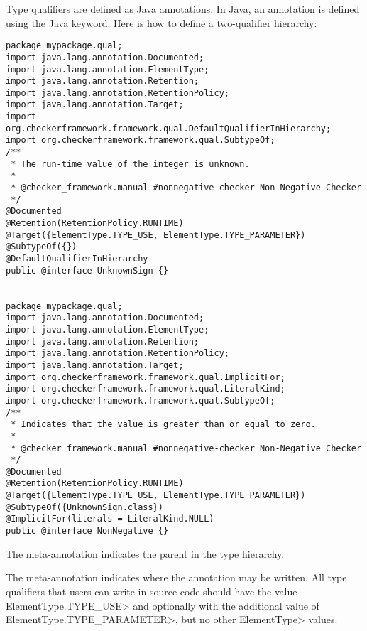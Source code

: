 Type qualifiers are defined as Java annotations.  In Java, an
annotation is defined using the Java  keyword.
Here is how to define a two-qualifier hierarchy:

\begin{Verbatim}
package mypackage.qual;
import java.lang.annotation.Documented;
import java.lang.annotation.ElementType;
import java.lang.annotation.Retention;
import java.lang.annotation.RetentionPolicy;
import java.lang.annotation.Target;
import org.checkerframework.framework.qual.DefaultQualifierInHierarchy;
import org.checkerframework.framework.qual.SubtypeOf;
/**
 * The run-time value of the integer is unknown.
 *
 * @checker_framework.manual #nonnegative-checker Non-Negative Checker
 */
@Documented
@Retention(RetentionPolicy.RUNTIME)
@Target({ElementType.TYPE_USE, ElementType.TYPE_PARAMETER})
@SubtypeOf({})
@DefaultQualifierInHierarchy
public @interface UnknownSign {}


package mypackage.qual;
import java.lang.annotation.Documented;
import java.lang.annotation.ElementType;
import java.lang.annotation.Retention;
import java.lang.annotation.RetentionPolicy;
import java.lang.annotation.Target;
import org.checkerframework.framework.qual.ImplicitFor;
import org.checkerframework.framework.qual.LiteralKind;
import org.checkerframework.framework.qual.SubtypeOf;
/**
 * Indicates that the value is greater than or equal to zero.
 *
 * @checker_framework.manual #nonnegative-checker Non-Negative Checker
 */
@Documented
@Retention(RetentionPolicy.RUNTIME)
@Target({ElementType.TYPE_USE, ElementType.TYPE_PARAMETER})
@SubtypeOf({UnknownSign.class})
@ImplicitFor(literals = LiteralKind.NULL)
public @interface NonNegative {}
\end{Verbatim}

The  meta-annotation
indicates the parent in the type hierarchy.

The 
meta-annotation indicates where the annotation
may be written. All type qualifiers that users can write in source code should
have the value \<ElementType.TYPE\_USE> and optionally with the additional value
of \<ElementType.TYPE\_PARAMETER>, but no other \<ElementType> values.

